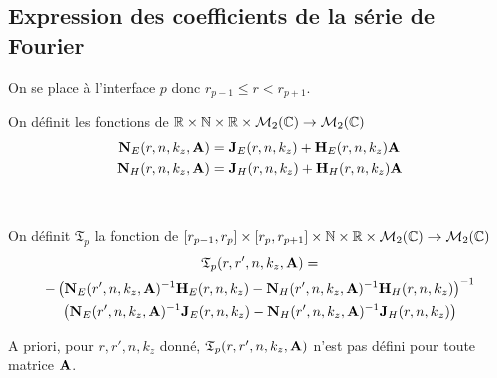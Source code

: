   \subsection{Expression des coefficients de la série de Fourier}

    On se place à l'interface \(p\) donc \(r_{p-1} \le r < r_{p+1} \).

    \begin{defn}
      \label{def:cylindre:matrices_NE-NH}
      On définit les fonctions de \(\mathbb R\times \mathbb N \times \mathbb R \times \mathcal{M}_{2}(\mathbb C) \rightarrow \mathcal{M}_{2}(\mathbb C)\)
      \begin{align*}
        \mathbf{N}_{E}(r,n,k_z,\mathbf{A}) &= \mathbf{J}_{E}(r,n,k_z) + \mathbf{H}_{E}(r,n,k_z)\mathbf{A}
        \\
        \mathbf{N}_{H}(r,n,k_z,\mathbf{A}) &= \mathbf{J}_{H}(r,n,k_z) + \mathbf{H}_{H}(r,n,k_z)\mathbf{A}
      \end{align*}
    \end{defn}

    \begin{defn}%
      \label{def:cylindre:transfert:reflexion}{}~

      On définit \(\mathfrak{T}_p\) la fonction de \([r_{p-1}, r_p]\times[r_p, r_{p+1}]\times\mathbb N\times\mathbb R\times\mathcal{M}_2(\mathbb C)\rightarrow \mathcal{M}_{2}(\mathbb C)\)
      \begin{multline*}
        \mathfrak{T}_p(r,r',n,k_z,\mathbf{A}) = \\
          -\left(\mathbf{N}_{E}(r',n,k_z,\mathbf{A})^{-1}\mathbf{H}_{E}(r,n,k_z) - \mathbf{N}_{H}(r',n,k_z,\mathbf{A})^{-1}\mathbf{H}_{H}(r,n,k_z)\right)^{-1}
          \\
          \left(\mathbf{N}_{E}(r',n,k_z,\mathbf{A})^{-1}\mathbf{J}_{E}(r,n,k_z) - \mathbf{N}_{H}(r',n,k_z,\mathbf{A})^{-1}\mathbf{J}_{H}(r,n,k_z)\right)
      \end{multline*}
    \end{defn}
    A priori, pour \(r,r',n,k_z\) donné, \(\mathfrak{T}_p(r,r',n,k_z,\mathbf{A})\) n'est pas défini pour toute matrice \(\mathbf{A}\).

